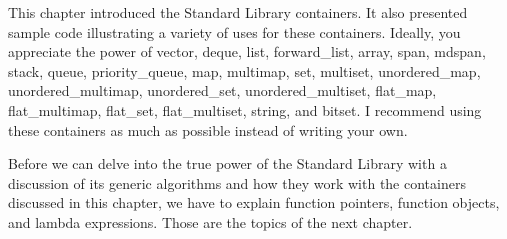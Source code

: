 This chapter introduced the Standard Library containers. It also presented sample code illustrating a variety of uses for these containers. Ideally, you appreciate the power of vector, deque, list, forward\_list, array, span, mdspan, stack, queue, priority\_queue, map, multimap, set, multiset, unordered\_map, unordered\_multimap, unordered\_set, unordered\_multiset, flat\_map, flat\_multimap, flat\_set, flat\_multiset, string, and bitset. I recommend using these containers as much as possible instead of writing your own.

Before we can delve into the true power of the Standard Library with a discussion of its generic algorithms and how they work with the containers discussed in this chapter, we have to explain function pointers, function objects, and lambda expressions. Those are the topics of the next chapter.
